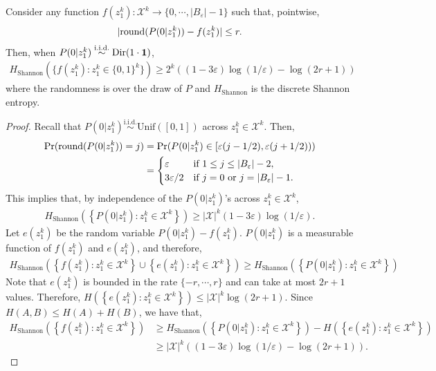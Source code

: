 \begin{lemma} \label{lemma:1}
Consider any function $f (z_1^k) : \mathcal{X}^k \to \{ 0,\cdots, |B_\varepsilon| - 1 \}$ such that, pointwise,
\begin{align}
    |\mathrm{round} ( P(0|z_1^k)) - f(z_1^k)| \le r.
\end{align}
Then, when $P(0|z_1^k) \overset{\text{i.i.d.}}{\sim} \mathrm{Dir}(1 \cdot \bm{1})$,
\begin{align}
    H_{\text{Shannon}} ( \{ f(z_1^k) : z_1^k \in \{0,1\}^k \} ) \ge 2^k \left( (1 - 3 \varepsilon) \log (1/\varepsilon) - \log (2r+1)\right)
\end{align}
where the randomness is over the draw of $P$ and $H_{\text{Shannon}}$ is the discrete Shannon entropy.
\end{lemma}
\begin{proof}
Recall that $P(0|z_1^k) \overset{\text{i.i.d.}}{\sim} \text{Unif} ([0,1])$ across $z_1^k \in \mathcal{X}^k$. Then,
\begin{align}
    \Pr (\mathrm{round} (P(0|z_1^k)) = j) &= \Pr (P(0|z_1^k) \in [\varepsilon(j-1/2),\varepsilon(j+1/2))) \\
    &= \begin{cases}
        \varepsilon \quad &\text{if } 1 \le j \le |B_\varepsilon|-2, \\
        3\varepsilon/2 &\text{if } j = 0 \text{ or } j = |B_\varepsilon|-1.
    \end{cases}
\end{align}
This implies that, by independence of the $P (0|z_1^k)$'s across $z_1^k \in \mathcal{X}^k$,
\begin{align}
    H_{\text{Shannon}} \left( \left\{ P(0|z_1^k) : z_1^k \in \mathcal{X}^k \right\} \right) \ge |\mathcal{X}|^k  (1 - 3 \varepsilon) \log (1/\varepsilon).
\end{align}
Let $e(z_1^k)$ be the random variable $P(0|z_1^k) - f(z_1^k)$. $P(0|z_1^k)$ is a measurable function of $f(z_1^k)$ and $e (z_1^k)$, and therefore,
\begin{align}
    H_{\text{Shannon}} \left( \left\{ f(z_1^k) : z_1^k \in \mathcal{X}^k \right\} \cup \left\{ e(z_1^k) : z_1^k \in \mathcal{X}^k \right\} \right) \ge H_{\text{Shannon}} \left( \left\{ P(0|z_1^k) : z_1^k \in \mathcal{X}^k \right\} \right)
\end{align}
Note that $e (z_1^k)$ is bounded in the rate $\{ -r,\cdots,r\}$ and can take at most $2r+1$ values. Therefore, $H \left( \left\{ e(z_1^k) : z_1^k \in \mathcal{X}^k \right\} \right) \le |\mathcal{X}|^k \log (2r+1)$. Since $H(A,B) \le H(A) + H(B)$, we have that,
\begin{align}
    H_{\text{Shannon}} \left( \left\{ f(z_1^k) : z_1^k \in \mathcal{X}^k \right\} \right) &\ge H_{\text{Shannon}} \left( \left\{ P(0|z_1^k) : z_1^k \in \mathcal{X}^k \right\} \right) - H \left( \left\{ e(z_1^k) : z_1^k \in \mathcal{X}^k \right\} \right) \\
    &\ge |\mathcal{X}|^k \left( (1 - 3 \varepsilon) \log(1/\varepsilon) - \log (2r+1) \right).
\end{align}
\end{proof}

